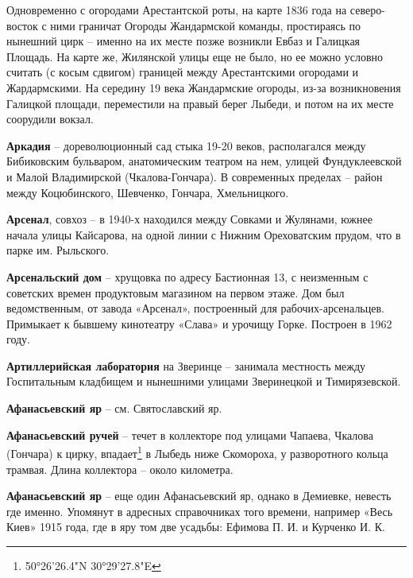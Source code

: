 Одновременно с огородами Арестантской роты, на карте 1836 года на северо-восток с ними граничат Огороды Жандармской команды, простираясь по нынешний цирк – именно на их месте позже возникли Евбаз и Галицкая Площадь. На карте же, Жилянской улицы еще не было, но ее можно условно считать (с косым сдвигом) границей между Арестантскими огородами и Жардармскими. На середину 19 века Жандармские огороды, из-за возникновения Галицкой площади, переместили на правый берег Лыбеди, и потом на их месте соорудили вокзал.\\

\medskip


\textbf{Аркадия} – дореволюционный сад стыка 19-20 веков, располагался между Бибиковским бульваром, анатомическим театром на нем, улицей Фундуклеевской и Малой Владимирской (Чкалова-Гончара). В современных пределах – район между Коцюбинского, Шевченко, Гончара, Хмельницкого.\\ 

\medskip


\textbf{Арсенал}, совхоз – в 1940-х находился между Совками и Жулянами, южнее начала улицы Кайсарова, на одной линии с Нижним Ореховатским прудом, что в парке им. Рыльского.\\

\medskip


\textbf{Арсенальский дом} – хрущовка по адресу Бастионная 13, с неизменным с советских времен продуктовым магазином на первом этаже. Дом был ведомственным, от завода «Арсенал», построенный для рабочих-арсенальцев. Примыкает к бывшему кинотеатру «Слава» и урочищу Горке. Построен в 1962 году.\\

\medskip


\textbf{Артиллерийская лаборатория} на Зверинце – занимала местность между Госпитальным кладбищем и нынешними улицами Зверинецкой и Тимирязевской.\\

\medskip


\textbf{Афанасьевский яр} – см. Святославский яр.\\

\medskip


\textbf{Афанасьевский ручей} – течет в коллекторе под улицами Чапаева, Чкалова (Гончара) к цирку, впадает\footnote{50°26'26.4"N 30°29'27.8"E} в Лыбедь ниже Скомороха, у разворотного кольца трамвая. Длина коллектора – около километра.\\

\medskip


\textbf{Афанасьевский яр} – еще один Афанасьевский яр, однако в Демиевке, невесть где именно. Упомянут в адресных справочниках того времени, например «Весь Киев» 1915 года, где в яру том две усадьбы: Ефимова П. И. и Курченко И. К.
